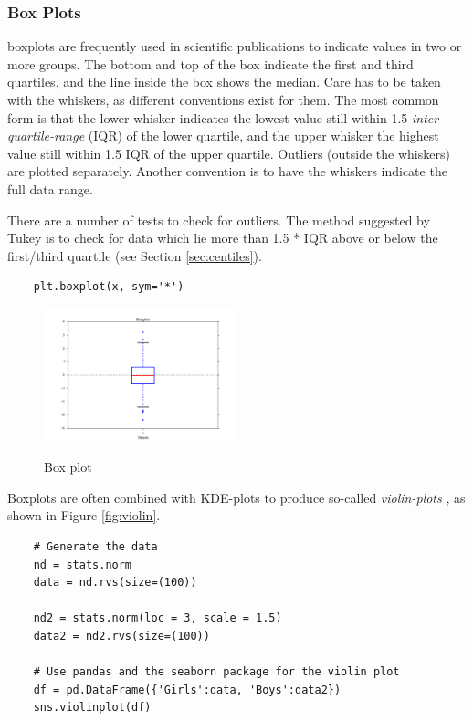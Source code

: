 \subsubsection{Box Plots}

\Glspl{boxplot} are frequently used in scientific publications to indicate values in two or more groups. The bottom and top of the box indicate the first and third \glspl{quartile}, and the line inside the box shows the median. Care has to be taken with the whiskers, as different conventions exist for them. The most common form is that the lower whisker indicates the lowest value still within 1.5 \emph{inter-quartile-range} (IQR) of the lower quartile, and the upper whisker the highest value still within 1.5 IQR of the upper quartile. Outliers (outside the whiskers) are plotted separately. Another convention is to have the whiskers indicate the full data range.

There are a number of tests to check for outliers. The method suggested by Tukey is to check for data which lie more than 1.5 * IQR above or below the first/third quartile (see Section \ref{sec:centiles}).

\begin{lstlisting}
    plt.boxplot(x, sym='*')
\end{lstlisting}

\begin{figure}[H]
  \centering
  \includegraphics[width=0.5\textwidth]{../Images/boxplot.png}\\
  \caption{Box plot}\label{fig:Boxplot}
\end{figure}

Boxplots are often combined with KDE-plots to produce so-called \emph{violin-plots} , as shown in Figure \ref{fig:violin}.

\begin{lstlisting}
    # Generate the data
    nd = stats.norm
    data = nd.rvs(size=(100))

    nd2 = stats.norm(loc = 3, scale = 1.5)
    data2 = nd2.rvs(size=(100))

    # Use pandas and the seaborn package for the violin plot
    df = pd.DataFrame({'Girls':data, 'Boys':data2})
    sns.violinplot(df)
\end{lstlisting}

